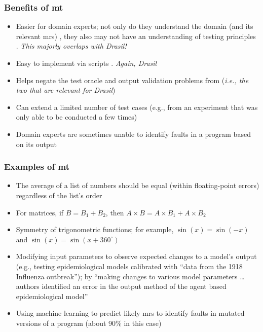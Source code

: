 \subsubsection{Benefits of \acs{mt}}
\begin{itemize}
      \item Easier for domain experts; not only do they understand the domain
            (and its relevant \acp{mr}) \cite[p.~70]{kanewala_metamorphic_2019},
            they also may not have an understanding of testing principles
            \cite[p.~69]{kanewala_metamorphic_2019}. \emph{This majorly
                  overlaps with Drasil!}
      \item Easy to implement via scripts \cite[p.~69]{kanewala_metamorphic_2019}.
            \emph{Again, Drasil}
      \item Helps negate the test oracle \cite[p.~69]{kanewala_metamorphic_2019}
            and output validation \cite[p.~70]{kanewala_metamorphic_2019} problems
            from  (\emph{i.e.,
                  the two that are relevant for Drasil})
      \item Can extend a limited number of test cases (e.g., from an
            experiment that was only able to be conducted a few times)
            \cite[pp.~70-72]{kanewala_metamorphic_2019}
      \item Domain experts are sometimes unable to identify faults in a program
            based on its output \cite[p.~71]{kanewala_metamorphic_2019}
\end{itemize}

\subsubsection{Examples of \acs{mt}}
\begin{itemize}
      \item The average of a list of numbers should be equal (within
            floating-point errors) regardless of the list's order
            \cite[p.~67]{kanewala_metamorphic_2019}
      \item For matrices, if $B = B_1 + B_2$, then $A \times B = A \times B_1
                  + A \times B_2$ \cite[pp.~68-69]{kanewala_metamorphic_2019}
      \item Symmetry of trigonometric functions; for example, $\sin(x) = \sin(-x)$
            and $\sin(x) = \sin(x + 360^{\circ})$ \cite[p.~70]{kanewala_metamorphic_2019}
      \item Modifying input parameters to observe expected changes to a model's
            output (e.g., testing epidemiological models calibrated with
            ``data from the 1918 Influenza outbreak''); by ``making changes to
            various model parameters \dots authors identified an error in the
            output method of the agent based epidemiological model''
            \cite[p.~70]{kanewala_metamorphic_2019}
      \item Using machine learning to predict likely \acsp{mr} to identify
            faults in mutated versions of a program (about 90\% in this case)
            \cite[p.~71]{kanewala_metamorphic_2019}
\end{itemize}

